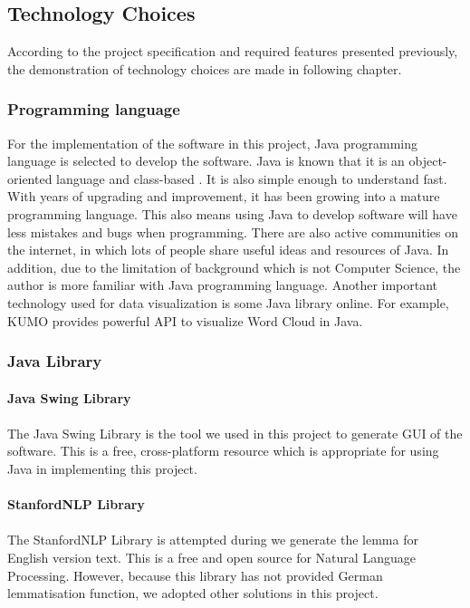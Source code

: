 \subsection{Technology Choices}
According to the project specification and required features presented previously, the demonstration of technology choices are made in following chapter.
\subsubsection{Programming language}
For the implementation of the software in this project, Java programming language is selected to develop the software. Java is known that it is an object-oriented language and class-based \cite{Gosling, James; Joy, Bill; Steele, Guy; Bracha, Gilad; Buckley, 2014}. It is also simple enough to understand fast. With years of upgrading and improvement, it has been growing into a mature programming language. This also means using Java to develop software will have less mistakes and bugs when programming. There are also active communities on the internet, in which lots of people share useful ideas and resources of Java. In addition, due to the limitation of background which is not Computer Science, the author is more familiar with Java programming language. 
Another important technology used for data visualization is some Java library online. For example, KUMO provides powerful API to visualize Word Cloud in Java. 

\subsubsection{Java Library}

\paragraph{Java Swing Library}
\paragraph[]{} The Java Swing Library is the tool we used in this project to generate GUI of the software. This is a free, cross-platform resource which is appropriate for using Java in implementing this project.

\paragraph{StanfordNLP Library}
\paragraph[]{} The StanfordNLP Library is attempted during we generate the lemma for English version text. This is a free and open source for Natural Language Processing. However, because this library has not provided German lemmatisation function, we adopted other solutions in this project.

